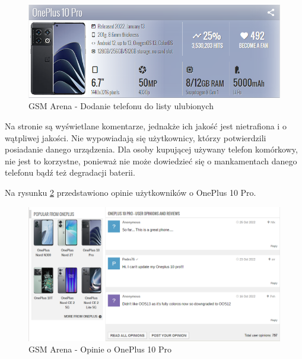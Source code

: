 \begin{figure}[H]
    \centering
    \includegraphics[scale=0.77]{img/GSM Arena/GSMArena_become_a_fan.png}
    \caption{GSM Arena - Dodanie telefonu do listy ulubionych}
    \label{GSM_Arena_4}
\end{figure}
Na stronie są wyświetlane komentarze, jednakże ich jakość jest nietrafiona i o wątpliwej jakości. Nie wypowiadają się użytkownicy, którzy potwierdzili posiadanie danego urządzenia. Dla osoby kupującej używany telefon komórkowy, nie jest to korzystne, ponieważ nie może dowiedzieć się o mankamentach danego telefonu bądź też degradacji baterii.

Na rysunku \ref*{GSM_Arena_5} przedstawiono opinie użytkowników o OnePlus 10 Pro.
\begin{figure}[H]
    \centering
    \includegraphics[scale=0.53]{img/GSM Arena/Comments.png}
    \caption{GSM Arena - Opinie o OnePlus 10 Pro}
    \label{GSM_Arena_5}
\end{figure}

